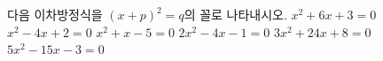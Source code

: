 다음 이차방정식을 $(x+p)^2=q$의 꼴로 나타내시오.
 $x^2+6x+3=0$
 $x^2-4x+2=0$
 $x^2+x-5=0$
 $2x^2-4x-1=0$
 $3x^2+24x+8=0$
 $5x^2-15x-3=0$
